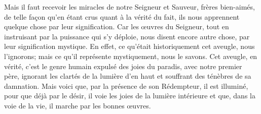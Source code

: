 Mais il faut recevoir les miracles de notre Seigneur et Sauveur,
		frères bien-aimés,
	de telle façon qu’en étant crus quant à la vérité du fait,
	ils nous apprennent quelque chose par leur signification.
Car les œuvres du Seigneur,
	tout en instruisant par la puissance qui s’y déploie,
	nous disent encore autre chose, par leur signification mystique.
En effet, ce qu’était historiquement cet aveugle, nous l’ignorons;
	mais ce qu’il représente mystiquement, nous le savons.
Cet aveugle, en vérité, c’est le genre humain
	expulsé des joies du paradis, avec notre premier père,
	ignorant les clartés de la lumière d’en haut
	et souffrant des ténèbres de sa damnation.
Mais voici que, par la présence de son Rédempteur, il est illuminé,
	pour que déjà par le désir, il voie les joies de la lumière intérieure
	et que, dans la voie de la vie, il marche par les bonnes œuvres.
